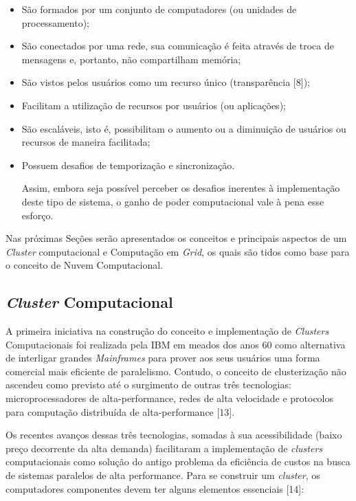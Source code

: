 \begin{itemize}
    \item São formados por um conjunto de computadores (ou unidades de processamento);
    \item São conectados por uma rede, sua comunicação é feita através de troca de mensagens e, portanto, não compartilham memória;
    \item São vistos pelos usuários como um recurso único (transparência [8]);
    \item Facilitam a utilização de recursos por usuários (ou aplicações);
    \item São escaláveis, isto é, possibilitam o aumento ou a diminuição de usuários ou recursos de maneira facilitada;
    \item Possuem desafios de temporização e sincronização.
    
    Assim, embora seja possível perceber os desafios inerentes à implementação deste tipo de sistema, o ganho de poder computacional vale à pena esse esforço.
\end{itemize}

Nas próximas Seções serão apresentados os conceitos e principais aspectos de um \textit{Cluster} computacional e Computação em \textit{Grid}, os quais são tidos como base para o conceito de Nuvem Computacional.

\subsection{\textit{Cluster} Computacional} \label{cap2sec1subsec1}

A primeira iniciativa na construção do conceito e implementação de \textit{Clusters} Computacionais foi realizada pela IBM em meados dos anos 60 como alternativa de interligar grandes \textit{Mainframes} para prover aos seus usuários uma forma comercial mais eficiente de paralelismo. Contudo, o conceito de clusterização não ascendeu como previsto até o surgimento de outras três tecnologias: microprocessadores de alta-performance, redes de alta velocidade e protocolos para computação distribuída de alta-performance [13]. 

Os recentes avanços dessas três tecnologias, somadas à sua acessibilidade (baixo preço decorrente da alta demanda) facilitaram a implementação de \textit{clusters} computacionais como solução do antigo problema da eficiência de custos na busca de sistemas paralelos de alta performance. Para se construir um \textit{cluster}, os computadores componentes devem ter alguns elementos essenciais [14]:

